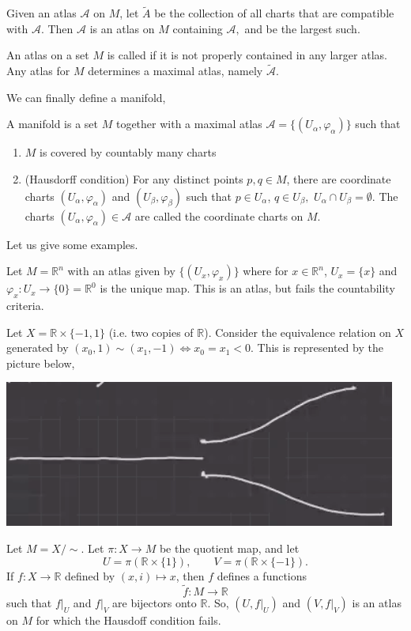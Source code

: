 \documentclass{article}
\numberwithin{equation}{section}
\begin{document}
\begin{theorem}
    Given an atlas $\mathcal{A}$ on $M$, let $\tilde{A}$ be the collection of all charts that are compatible with $\mathcal{A}$. Then $\mathcal{A}$ is an atlas on $M$ containing $\mathcal{A},$ and be the largest such.
\end{theorem}
\begin{definition}
    An atlas on a set $M$ is called  if it is not properly contained in any larger atlas. Any atlas for $M$ determines a maximal atlas, namely $\tilde{\mathcal{A}}.$
\end{definition}
We can finally define a manifold,
\begin{definition}
    A manifold is a set $M$ together with a maximal atlas $\mathcal{A} = \{(U_\alpha, \varphi_\alpha)\}$ such that 
    \begin{enumerate}
        \item $M$ is covered by countably many charts
        \item (Hausdorff condition) For any distinct points $p,q \in M$, there are coordinate charts $(U_\alpha,\varphi_\alpha)$ and $(U_\beta,\varphi_\beta)$ such that $p \in U_\alpha$, $q\in U_\beta,$ $U_\alpha \cap U_\beta = \emptyset.$ The charts $(U_\alpha, \varphi_\alpha) \in \mathcal{A}$ are called the coordinate charts on $M$.
    \end{enumerate}
\end{definition}
Let us give some examples.
\begin{example}
    Let $M=\mathbb{R}^n$ with an atlas given by $\{(U_x,\varphi_x)\}$ where for $x\in \mathbb{R}^n$, $U_x = \{x\}$ and $\varphi_x: U_x \to \{0\} = \mathbb{R}^0$ is the unique map. This is an atlas, but fails the countability criteria.
\end{example}
\begin{example}
    Let $X= \mathbb{R} \times \{-1,1\}$ (i.e. two copies of $\mathbb{R}$). Consider the equivalence relation on $X$ generated by $(x_0,1) \sim (x_1,-1) \iff x_0 = x_1 < 0.$ This is represented by the picture below,
\begin{center}
    \includegraphics[width=0.4\linewidth]{L3.png}
\end{center}
    Let $M = X/\sim$. Let $\pi: X \rightarrow M$ be the quotient map, and let
    \begin{equation}
        U = \pi(\mathbb{R}\times \{1\}),\quad\quad V = \pi(\mathbb{R}\times \{-1\}).
    \end{equation}
    If $f:X\rightarrow \mathbb{R}$ defined by $(x,i) \mapsto x$, then $f$ defines a functions
    \begin{equation}
        \tilde{f}: M\rightarrow \mathbb{R}
    \end{equation}
    such that $f|_U$ and $f|_V$ are bijectors onto $\mathbb{R}$. So, $(U,f|_U)$ and $(V,f|_V)$ is an atlas on $M$ for which the Hausdoff condition fails.
\end{example}
\end{document}
